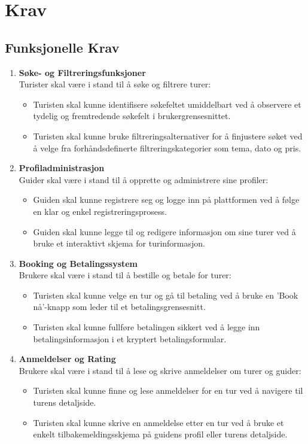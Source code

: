 \documentclass[../doc.tex]{subfiles}
\begin{document}
\section{Krav}
\subsection{Funksjonelle Krav}
\begin{enumerate}
    \item \textbf{Søke- og Filtreringsfunksjoner} \\
    Turister skal være i stand til å søke og filtrere turer:
    \begin{itemize}
        \item Turisten skal kunne identifisere søkefeltet umiddelbart ved å observere et tydelig og fremtredende søkefelt i brukergrensesnittet.
        \item Turisten skal kunne bruke filtreringsalternativer for å finjustere søket ved å velge fra forhåndsdefinerte filtreringskategorier som tema, dato og pris.
    \end{itemize}

    \item \textbf{Profiladministrasjon} \\
    Guider skal være i stand til å opprette og administrere sine profiler:
    \begin{itemize}
        \item Guiden skal kunne registrere seg og logge inn på plattformen ved å følge en klar og enkel registreringsprosess.
        \item Guiden skal kunne legge til og redigere informasjon om sine turer ved å bruke et interaktivt skjema for turinformasjon.
    \end{itemize}
    \item \textbf{Booking og Betalingssystem} \\
    Brukere skal være i stand til å bestille og betale for turer:
    \begin{itemize}
        \item Turisten skal kunne velge en tur og gå til betaling ved å bruke en 'Book nå'-knapp som leder til et betalingsgrensesnitt.
        \item Turisten skal kunne fullføre betalingen sikkert ved å legge inn betalingsinformasjon i et kryptert betalingsformular.
    \end{itemize}

    \item \textbf{Anmeldelser og Rating} \\ 
    Brukere skal være i stand til å lese og skrive anmeldelser om turer og guider:
    \begin{itemize}
        \item Turisten skal kunne finne og lese anmeldelser for en tur ved å navigere til turens detaljside.
        \item Turisten skal kunne skrive en anmeldelse etter en tur ved å bruke et enkelt tilbakemeldingsskjema på guidens profil eller turens detaljside.
    \end{itemize}


\end{enumerate}
\end{document}
